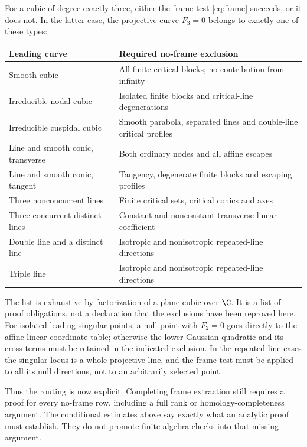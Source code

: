 For a cubic of degree exactly three, either the frame test
\eqref{eq:frame} succeeds, or it does not. In the latter case,
the projective curve $F_3=0$ belongs to exactly one of these types:
\begin{center}\small
\begin{tabular}{@{}p{}p{}@{}}
\toprule
Leading curve & Required no-frame exclusion\\
\midrule
Smooth cubic & All finite critical blocks; no contribution from infinity\\
Irreducible nodal cubic & Isolated finite blocks and critical-line degenerations\\
Irreducible cuspidal cubic & Smooth parabola, separated lines and double-line critical profiles\\
Line and smooth conic, transverse & Both ordinary nodes and all affine escapes\\
Line and smooth conic, tangent & Tangency, degenerate finite blocks and escaping profiles\\
Three nonconcurrent lines & Finite critical sets, critical conics and axes\\
Three concurrent distinct lines & Constant and nonconstant transverse linear coefficient\\
Double line and a distinct line & Isotropic and nonisotropic repeated-line directions\\
Triple line & Isotropic and nonisotropic repeated-line directions\\
\bottomrule
\end{tabular}
\end{center}
The list is exhaustive by factorization of a plane cubic over $\C$.
It is a list of proof obligations, not a declaration that the exclusions
have been reproved here. For isolated leading singular points, a null
point with $F_2=0$ goes directly to the affine-linear-coordinate table;
otherwise the lower Gaussian quadratic and its cross terms must be
retained in the indicated exclusion. In the repeated-line cases the
singular locus is a whole projective line, and the frame test must be
applied to all its null directions, not to an arbitrarily selected point.

Thus the routing is now explicit. Completing frame extraction still
requires a proof for every no-frame row, including a full rank or
homology-completeness argument. The conditional estimates above say
exactly what an analytic proof must establish. They do not promote
finite algebra checks into that missing argument.
